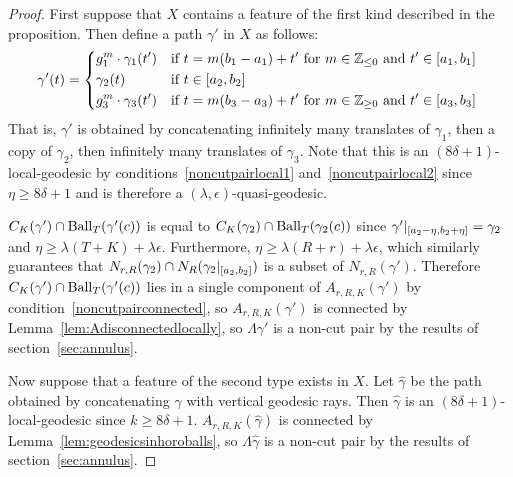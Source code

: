 \begin{proof} First suppose that $X$ contains a feature of the first kind
described in the proposition.  Then define a path $\gamma'$ in $X$ as follows:
\begin{align*} \gamma'(t) = 
  \begin{dcases}
    g_1^m \cdot \gamma_1(t') & \text{if $t = m(b_1 - a_1) + t'$ for 
      $m \in \mathbb{Z}_{\leq 0}$ and $t' \in [a_1, b_1]$ }\\
    \gamma_2(t) & \text{if $t \in [a_2, b_2]$}\\
    g_3^m \cdot \gamma_3(t') & \text{if $t = m(b_3 - a_3) + t'$ for 
      $m \in \mathbb{Z}_{\geq 0}$ and $t' \in [a_3, b_3]$ }\\
  \end{dcases}
\end{align*}
That is, $\gamma'$ is obtained by concatenating infinitely many translates of
$\gamma_1$, then a copy of $\gamma_2$, then infinitely many translates of
$\gamma_3$. Note that this is an $(8\delta + 1)$-local-geodesic by
conditions~\ref{noncutpairlocal1} and~\ref{noncutpairlocal2} since $\eta \geq
8\delta + 1$ and is therefore a $(\lambda, \epsilon)$-quasi-geodesic.

$C_K(\gamma') \cap \operatorname{\mathrm{Ball}}_T(\gamma'(c))$ is equal to $C_K(\gamma_2)
\cap \operatorname{\mathrm{Ball}}_T(\gamma_2(c))$ since $\gamma'\vert_{[a_2 - \eta, b_2 +
\eta]} = \gamma_2$ and $\eta \geq \lambda(T + K) + \lambda\epsilon$.
Furthermore, $\eta \geq \lambda (R + r) + \lambda\epsilon$, which similarly
guarantees that $N_{r, R}(\gamma_2) \cap N_R(\gamma_2\vert_{[a_2,
b_2]})$ is a subset of $N_{r, R}(\gamma')$. Therefore $C_K(\gamma')
\cap \operatorname{\mathrm{Ball}}_T(\gamma'(c))$ lies in a single component of $A_{r, R,
K}(\gamma')$ by condition~\ref{noncutpairconnected}, so $A_{r, R, K}(\gamma')$
is connected by Lemma~\ref{lem:Adisconnectedlocally}, so $\Lambda\gamma'$ is a
non-cut pair by the results of section~\ref{sec:annulus}.

Now suppose that a feature of the second type exists in $X$. Let $\hat\gamma$
be the path obtained by concatenating $\gamma$ with vertical geodesic rays.
Then $\hat\gamma$ is an $(8\delta+1)$-local-geodesic since $k \geq 8\delta+1$.
$A_{r, R, K}(\hat\gamma)$ is connected by Lemma~\ref{lem:geodesicsinhoroballs},
so $\Lambda\hat\gamma$ is a non-cut pair by the results of
section~\ref{sec:annulus}.


\end{proof}
